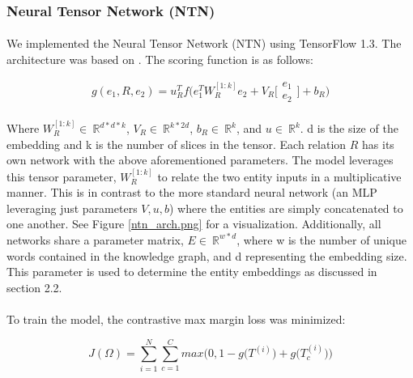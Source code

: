 \documentclass[11.5pt]{article}
\newcounter{Figure}
\newcommand{\R}{\ \mathbb{R}}
\begin{document}
\subsubsection{Neural Tensor Network (NTN)}
\paragraph{}  We implemented the Neural Tensor Network (NTN) using TensorFlow 1.3. The architecture was based on \cite{socher2013reasoning}. The scoring function is as follows:

\begin{equation}
g(e_1,R,e_2)  = u_R^Tf \bigg( e_1^TW_R^{[1:k]}e_2 + V_R 
\bigg[ \begin{matrix}  e_1 \\ e_2  \end{matrix} \bigg] + b_R \bigg)
\end{equation}

\paragraph{}  Where  $ W_R^{[1:k]} \in \R^ {d * d * k} $, $ V_R \in \R^ {k * 2d} $, $ b_R \in \R^ {k } $, and  $ u \in \R^ {k } $. d is the size of the embedding and k is the number of slices in the tensor. Each relation $R$ has its own network with the above aforementioned parameters. The model leverages this tensor parameter, $ W_R^{[1:k]} $ to relate the two entity inputs in a multiplicative manner. This is in contrast to the more standard neural network (an MLP leveraging just parameters $ V,u,b $) where the entities are simply concatenated to one another. See Figure \ref{ntn_arch.png} for a visualization. Additionally, all networks share a parameter matrix, $E \in \R^{w*d} $, where w is the number of unique words contained in the knowledge graph, and d representing the embedding size. This parameter is used to determine the entity embeddings as discussed in section 2.2.

\paragraph{}  To train the model, the contrastive max margin loss was minimized:


\begin{equation}
J(\Omega)  = \sum_{i=1}^{N} \sum_{c=1}^{C} max \bigg(0,1 - g\bigg( T^(i) \bigg) +  g\bigg( T_c^(i) \bigg)   \bigg)
\end{equation}
\end{document}
